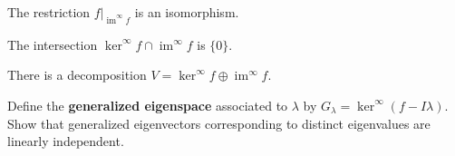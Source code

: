 \documentclass{homework}
\DeclareMathOperator{\image}{im}
\begin{document}
\vfill

\begin{problem}
  The restriction $f |_{\image^\infty f}$ is an isomorphism.
\end{problem}


\vfill

\begin{problem}
  The intersection $\ker^\infty f \cap \image^\infty f$ is $\{ 0 \}$.
\end{problem}


\vfill

\begin{problem}
  There is a decomposition $V = \ker^\infty f \oplus \image^\infty f$.
\end{problem}


\vfill

\begin{problem}
  Define the \textbf{generalized eigenspace} associated to $\lambda$ by $G_\lambda = \ker^\infty (f - I\lambda)$.  Show that generalized eigenvectors corresponding to distinct eigenvalues are linearly independent.
\end{problem}
\end{document}
